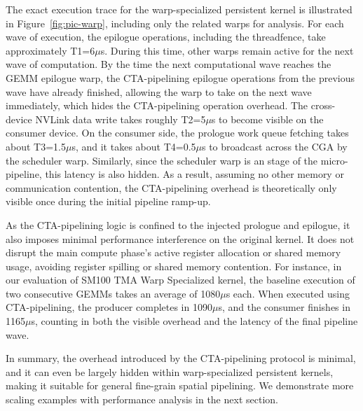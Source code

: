 The exact execution trace for the warp-specialized persistent kernel is illustrated in Figure~\ref{fig:pic-warp}, including only the related warps for analysis. For each wave of execution, the epilogue operations, including the threadfence, take approximately T1=6$\mu$s. During this time, other warps remain active for the next wave of computation. By the time the next computational wave reaches the GEMM epilogue warp, the CTA-pipelining epilogue operations from the previous wave have already finished, allowing the warp to take on the next wave immediately, which hides the CTA-pipelining operation overhead. The cross-device NVLink data write takes roughly T2=5$\mu$s to become visible on the consumer device. On the consumer side, the prologue work queue fetching takes about T3=1.5$\mu$s, and it takes about T4=0.5$\mu$s to broadcast across the CGA by the scheduler warp. Similarly, since the scheduler warp is an stage of the micro-pipeline, this latency is also hidden. As a result, assuming no other memory or communication contention, the CTA-pipelining overhead is theoretically only visible once during the initial pipeline ramp-up.

As the CTA-pipelining logic is confined to the injected prologue and epilogue, it also imposes minimal performance interference on the original kernel. It does not disrupt the main compute phase's active register allocation or shared memory usage, avoiding register spilling or shared memory contention. For instance, in our evaluation of SM100 TMA Warp Specialized kernel, the baseline execution of two consecutive GEMMs takes an average of 1080$\mu$s each. When executed using CTA-pipelining, the producer completes in 1090$\mu$s, and the consumer finishes in 1165$\mu$s, counting in both the visible overhead and the latency of the final pipeline wave.

In summary, the overhead introduced by the CTA-pipelining protocol is minimal, and it can even be largely hidden within warp-specialized persistent kernels, making it suitable for general fine-grain spatial pipelining. We demonstrate more scaling examples with performance analysis in the next section. 
